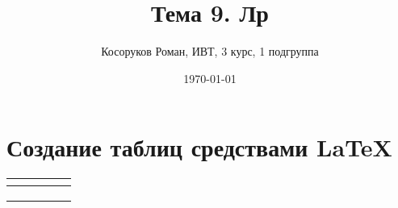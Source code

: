 \documentclass[a4paper,12pt]{article} %
\author{Косоруков Роман, ИВТ, 3 курс, 1 подгруппа}
\title{Тема 9. Лр}
\date{\today}
\begin{document}
\maketitle
\newpage

\section{Создание таблиц средствами \LaTeX}

\begin{tabular}{|p{1.5cm}|p{3.5cm}|p{1.5cm}|p{1.5cm}|p{1.5cm}|}\hline
     & &\multicolumn{3}{c|}{}\\ \hline
     & & & & \\ \hline
     & & & & \\ \hline
     & & & & \\ \hline
\end{tabular}
\end{document}

